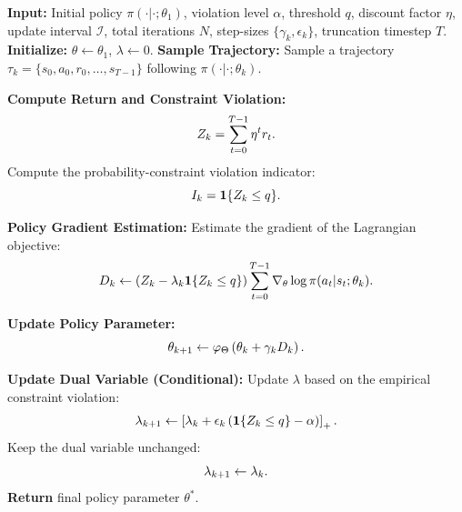 \begin{algorithm}[ht]
\caption{Probability-Constrained Policy Optimization}
\label{alg:pcpo}
\begin{algorithmic}[1]
\STATE \textbf{Input:} Initial policy $\pi(\cdot|\cdot;\theta_1)$, violation level $\alpha$, threshold $q$, discount factor $\eta$, update interval $\mathcal{I}$, total iterations $N$, step-sizes $\{\gamma_k,\epsilon_k\}$, truncation timestep $T$.
\STATE \textbf{Initialize:} $\theta \gets \theta_1$, $\lambda \gets 0$.
    \STATE \textbf{Sample Trajectory:}
    \STATE Sample a trajectory $\tau_k=\{s_0,a_0,r_0,\dots,s_{T-1}\}$ following $\pi(\cdot|\cdot;\theta_k)$.
    
    \STATE \textbf{Compute Return and Constraint Violation:}
    \begin{equation}
        Z_k
        =
        \sum_{t=0}^{T-1}\eta^t r_t .
        \notag
    \end{equation}
    \STATE Compute the probability-constraint violation indicator:
    \begin{equation}
        I_k
        =
        \mathbf{1}\{Z_k\le q\}.
        \notag
    \end{equation}
    
    \STATE \textbf{Policy Gradient Estimation:}
    \STATE Estimate the gradient of the Lagrangian objective:
    \begin{equation}
        D_k
        \gets
        \left(
        Z_k
        -
        \lambda_k \mathbf{1}\{Z_k\le q\}
        \right)
        \sum_{t=0}^{T-1}
        \nabla_\theta \log \pi(a_t|s_t;\theta_k).
        \notag
    \end{equation}
    
    \STATE \textbf{Update Policy Parameter:}
    \begin{equation}
        \theta_{k+1}
        \gets
        \varphi_\Theta
        \left(
        \theta_k+\gamma_k D_k
        \right).
        \notag
    \end{equation}
    
    \STATE \textbf{Update Dual Variable (Conditional):}
        \STATE Update $\lambda$ based on the empirical constraint violation:
        \begin{equation}
            \lambda_{k+1}
            \gets
            \left[
            \lambda_k+\epsilon_k
            \left(
            \mathbf{1}\{Z_k\le q\}-\alpha
            \right)
            \right]_{+}.
            \notag
        \end{equation}
    \ELSE
        \STATE Keep the dual variable unchanged:
        \begin{equation}
            \lambda_{k+1}\gets\lambda_k.
            \notag
        \end{equation}
    \ENDIF
\ENDFOR
\STATE \textbf{Return} final policy parameter $\theta^*$.
\end{algorithmic}
\end{algorithm}


